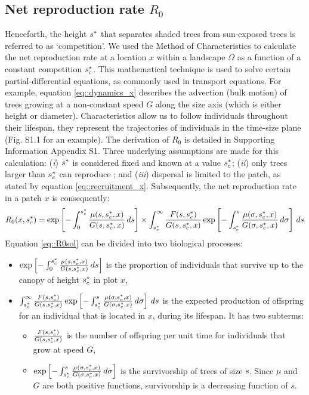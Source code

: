 \subsection{Net reproduction rate $ R_0 $}
Henceforth, the height $ {s}^{*} $ that separates shaded trees from sun-exposed trees is referred to as `competition'. We used the Method of Characteristics \citep{Olver2014b} to calculate the net reproduction rate at a location $ x $ within a landscape $ \Omega $ as a function of a constant competition $ {s}^{*}_c $. This mathematical technique is used to solve certain partial-differential equations, as commonly used in transport equations. For example, equation \eqref{eq::dynamics_x} describes the advection (bulk motion) of trees growing at a non-constant speed $ G $ along the size axis (which is either height or diameter). Characteristics allow us to follow individuals throughout their lifespan, \ie they represent the trajectories of individuals in the time-size plane (Fig. S1.1 for an example). The derivation of $ R_0 $ is detailed in Supporting Information Appendix S1. Three underlying assumptions are made for this calculation: (\textit{i}) $ {s}^{*} $ is considered fixed and known at a value $ {s}^{*}_c $; (\textit{ii}) only trees larger than $ {s}^{*}_c $ can reproduce \citep{Strigul2008}; and (\textit{iii}) dispersal is limited to the patch, as stated by equation \eqref{eq::recruitment_x}. Subsequently, the net reproduction rate in a patch $ x $ is consequently:
\begin{equation} \label{eq::R0sol}
	R_0 (x, {s}^{*}_c) = \exp \left[-\int_0^{{s}^{*}_c}\frac{\mu(s, {s}^{*}_c, x)}{G(s, {s}^{*}_c, x)} \, ds \right] \times \int_{{s}^{*}_c}^{\infty} \frac{F(s, {s}^{*}_c)}{G(s, {s}^{*}_c, x)} \exp \left[-\int_{{s}^{*}_c}^{s} \frac{\mu(\sigma, {s}^{*}_c, x)}{G(\sigma, {s}^{*}_c, x)} \, d\sigma \right] \, ds
\end{equation}
Equation \eqref{eq::R0sol} can be divided into two biological processes:
\begin{itemize}
	\item $ \exp\left[-\int_0^{{s}^{*}_c}\frac{\mu(s, {s}^{*}_c, x)}{G(s, {s}^{*}_c, x)} \, ds \right] $ is the proportion of individuals that survive up to the canopy of height $ {s}^{*}_c $ in plot $ x $,
	\item $ \int_{{s}^{*}_c}^{\infty} \frac{F(s, {s}^{*}_c)}{G(s, {s}^{*}_c, x)} \exp \left[-\int_{{s}^{*}_c}^{s} \frac{\mu(\sigma, {s}^{*}_c, x)}{G(\sigma, {s}^{*}_c, x)} \, d\sigma \right] \, ds $ is the expected production of offspring for an individual that is located in $ x $, during its lifespan. It has two subterms:
	\begin{itemize}[label=\tiny$ \blacksquare $]
		\item $ \frac{F(s, {s}^{*}_c)}{G(s, {s}^{*}_c, x)} $ is the number of offspring per unit time for individuals that grow at speed $ G $,
		\item $ \exp \left[-\int_{{s}^{*}_c}^{s} \frac{\mu(\sigma, {s}^{*}_c, x)}{G(\sigma, {s}^{*}_c, x)} \, d\sigma \right] $ is the survivorship of trees of size $ s $. Since $ \mu $ and $ G $ are both positive functions, survivorship is a decreasing function of $ s $.
	\end{itemize}
\end{itemize}

